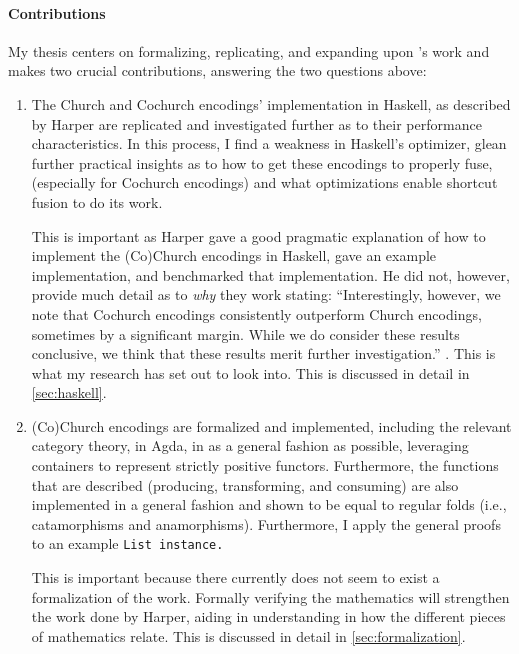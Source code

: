 \paragraph{Contributions}
My thesis centers on formalizing, replicating, and expanding upon \cite{Harper2011}'s work and makes two crucial contributions, answering the two questions above:
\begin{enumerate}
    \item The Church and Cochurch encodings' implementation in Haskell, as described by Harper are replicated and investigated further as to their performance characteristics.
    In this process, I find a weakness in Haskell's optimizer, glean further practical insights as to how to get these encodings to properly fuse, (especially for Cochurch encodings) and what optimizations enable shortcut fusion to do its work.

    This is important as Harper gave a good pragmatic explanation of how to implement the (Co)Church encodings in Haskell, gave an example implementation, and benchmarked that implementation.
    He did not, however, provide much detail as to \textit{why} they work stating: ``Interestingly, however, we note that Cochurch encodings consistently outperform Church encodings, sometimes by a significant margin. While we do consider these results conclusive, we think that these results merit further investigation.'' \citep{Harper2011}.
    This is what my research has set out to look into.
    This is discussed in detail in \autoref{sec:haskell}.
    \item (Co)Church encodings are formalized and implemented, including the relevant category theory, in Agda, in as a general fashion as possible, leveraging containers \citep{Abbott2005} to represent strictly positive functors.
    Furthermore, the functions that are described (producing, transforming, and consuming) are also implemented in a general fashion and shown to be equal to regular folds (i.e., catamorphisms and anamorphisms).
    Furthermore, I apply the general proofs to an example \tt{List} instance.

    This is important because there currently does not seem to exist a formalization of the work.
    Formally verifying the mathematics will strengthen the work done by Harper, aiding in understanding in how the different pieces of mathematics relate.
    This is discussed in detail in \autoref{sec:formalization}.
\end{enumerate}




